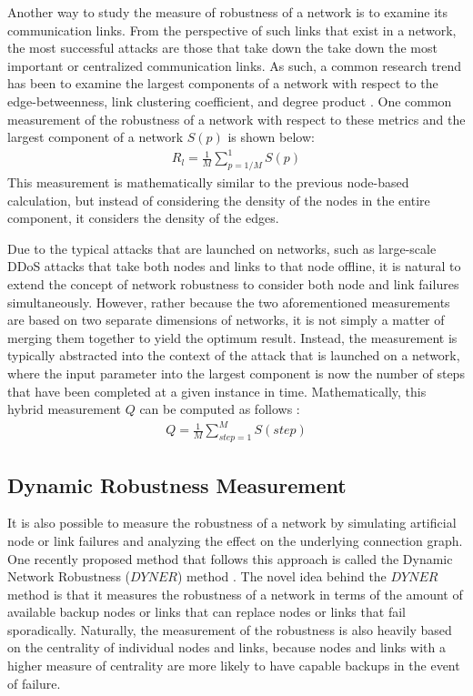 \documentclass[doc]{apa}%
\begin{document}

Another way to study the measure of robustness of a network is to examine its communication links. From the perspective of such links that exist in a network, the most successful attacks are those that take down the take down the most important or centralized communication links. As such, a common research trend has been to examine the largest components of a network with respect to the edge-betweenness, link clustering coefficient, and degree product \cite{NRMalicious}. One common measurement of the robustness of a network with respect to these metrics and the largest component of a network $S(p)$ is shown below:
\begin{eqnarray}
R_l = \frac{1}{M}\sum_{p = 1/M}^{1}S(p)
\end{eqnarray}
This measurement is mathematically similar to the previous node-based calculation, but instead of considering the density of the nodes in the entire component, it considers the density of the edges. 

Due to the typical attacks that are launched on networks, such as large-scale DDoS attacks that take both nodes and links to that node offline, it is natural to extend the concept of network robustness to consider both node and link failures simultaneously. However, rather because the two aforementioned measurements are based on two separate dimensions of networks, it is not simply a matter of merging them together to yield the optimum result. Instead, the measurement is typically abstracted into the context of the attack that is launched on a network, where the input parameter into the largest component is now the number of steps that have been completed at a given instance in time. Mathematically, this hybrid measurement $Q$ can be computed as follows \cite{NRMalicious}:
\begin{eqnarray}
Q = \frac{1}{M}\sum_{step  = 1}^{M}S(step)
\end{eqnarray}

\subsection{Dynamic Robustness Measurement}

It is also possible to measure the robustness of a network by simulating artificial node or link failures and analyzing the effect on the underlying connection graph. One recently proposed method that follows this approach is called the Dynamic Network Robustness ($DYNER$) method \cite{singerdynamic}. The novel idea behind the $DYNER$ method is that it measures the robustness of a network in terms of the amount of available backup nodes or links that can replace nodes or links that fail sporadically. Naturally, the measurement of the robustness is also heavily based on the centrality of individual nodes and links, because nodes and links with a higher measure of centrality are more likely to have capable backups in the event of failure. 
\end{document}
